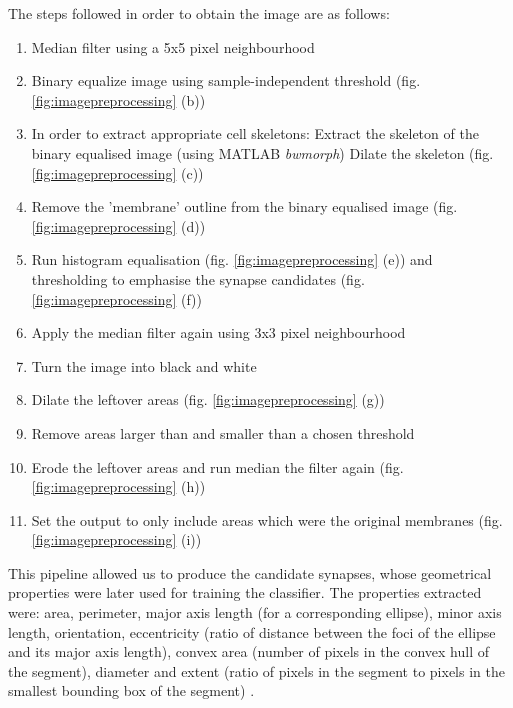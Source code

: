 \documentclass[a4paper, 11pt]{article}
\numberwithin{equation}{section}
\begin{document}
		\noindent The steps followed in order to obtain the image are as follows:
		\begin{enumerate}
			\item Median filter using a 5x5 pixel neighbourhood
			\item Binary equalize image using sample-independent threshold (fig. \ref{fig:imagepreprocessing} (b))
			\item In order to extract appropriate cell skeletons:
			\subitem Extract the skeleton of the binary equalised image (using MATLAB \textit{bwmorph})
			\subitem Dilate the skeleton (fig. \ref{fig:imagepreprocessing} (c))
			\item Remove the 'membrane' outline from the binary equalised image (fig. \ref{fig:imagepreprocessing} (d))
			\item Run histogram equalisation (fig. \ref{fig:imagepreprocessing} (e)) and thresholding to emphasise the synapse candidates (fig. \ref{fig:imagepreprocessing} (f))
			\item Apply the median filter again using 3x3 pixel neighbourhood
			\item Turn the image into black and white
			\item Dilate the leftover areas (fig. \ref{fig:imagepreprocessing} (g))
			\item Remove areas larger than and smaller than a chosen threshold
			\item Erode the leftover areas and run median the filter again (fig. \ref{fig:imagepreprocessing} (h))
			\item Set the output to only include areas which were the original membranes (fig. \ref{fig:imagepreprocessing} (i))
		\end{enumerate}
		
		\noindent This pipeline allowed us to produce the candidate synapses, whose geometrical properties were later used for training the classifier. The properties extracted were: area, perimeter, major axis length (for a corresponding ellipse), minor axis length, orientation, eccentricity (ratio of distance between the foci of the ellipse and its major axis length), convex area (number of pixels in the convex hull of the segment), diameter and extent (ratio of pixels in the segment to pixels in the smallest bounding box of the segment) \cite{navlakha2013high}.
		
\end{document}
